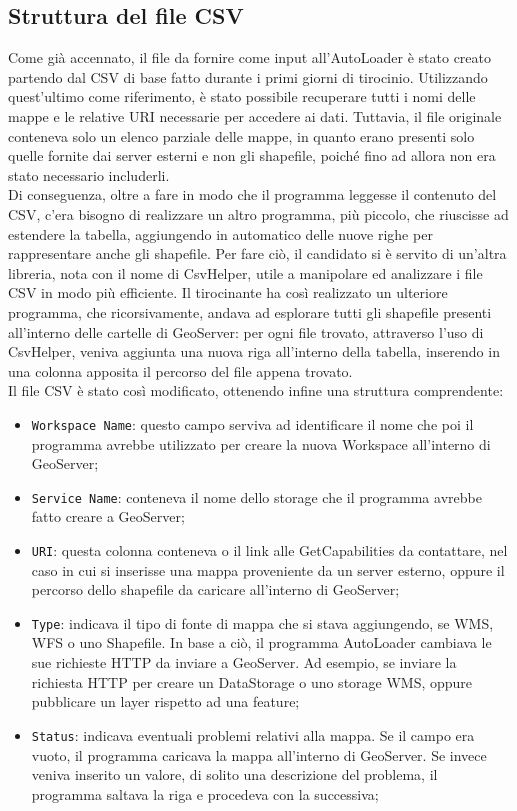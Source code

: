 \subsection{Struttura del file CSV}

Come già accennato, il file da fornire come input all'AutoLoader è stato creato partendo dal CSV di base fatto durante i primi giorni di tirocinio. Utilizzando quest'ultimo come riferimento, è stato possibile recuperare tutti i nomi delle mappe e le relative URI necessarie per accedere ai dati. Tuttavia, il file originale conteneva solo un elenco parziale delle mappe, in quanto erano presenti solo quelle fornite dai server esterni e non gli shapefile, poiché fino ad allora non era stato necessario includerli.
\\Di conseguenza, oltre a fare in modo che il programma leggesse il contenuto del CSV, c'era bisogno di realizzare un altro programma, più piccolo, che riuscisse ad estendere la tabella, aggiungendo in automatico delle nuove righe per rappresentare anche gli shapefile. Per fare ciò, il candidato si è servito di un'altra libreria, nota con il nome di CsvHelper, utile a manipolare ed analizzare i file CSV in modo più efficiente. Il tirocinante ha così realizzato un ulteriore programma, che ricorsivamente, andava ad esplorare tutti gli shapefile presenti all'interno delle cartelle di GeoServer: per ogni file trovato, attraverso l'uso di CsvHelper, veniva aggiunta una nuova riga all'interno della tabella, inserendo in una colonna apposita il percorso del file appena trovato. 
\\Il file CSV è stato così modificato, ottenendo infine una struttura comprendente:
\begin{itemize}
    \item \verb|Workspace Name|: questo campo serviva ad identificare il nome che poi il programma avrebbe utilizzato per creare la nuova Workspace all'interno di GeoServer;
    \item \verb|Service Name|: conteneva il nome dello storage che il programma avrebbe fatto creare a GeoServer;
    \item \verb|URI|: questa colonna conteneva o il link alle GetCapabilities da contattare, nel caso in cui si inserisse una mappa proveniente da un server esterno, oppure il percorso dello shapefile da caricare all'interno di GeoServer;
    \item \verb|Type|: indicava il tipo di fonte di mappa che si stava aggiungendo, se WMS, WFS o uno Shapefile. In base a ciò, il programma AutoLoader cambiava le sue richieste HTTP da inviare a GeoServer. Ad esempio, se inviare la richiesta HTTP per creare un DataStorage o uno storage WMS, oppure pubblicare un layer rispetto ad una feature;
    \item \verb|Status|: indicava eventuali problemi relativi alla mappa. Se il campo era vuoto, il programma caricava la mappa all'interno di GeoServer. Se invece veniva inserito un valore, di solito una descrizione del problema, il programma saltava la riga e procedeva con la successiva;
\end{itemize}
